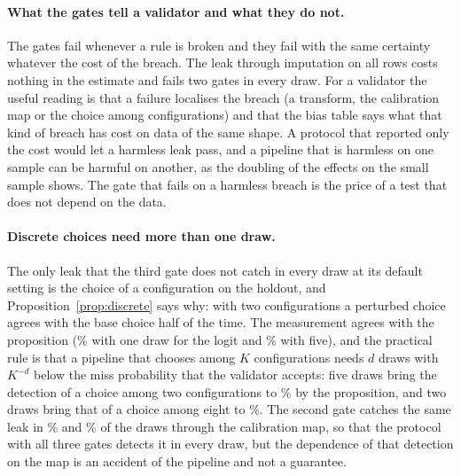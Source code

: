 \paragraph{What the gates tell a validator and what they do not.} The gates fail whenever a rule is broken and they fail with the same certainty whatever the cost of the breach. The leak through imputation on all rows costs nothing in the estimate and fails two gates in every draw. For a validator the useful reading is that a failure localises the breach (a transform, the calibration map or the choice among configurations) and that the bias table says what that kind of breach has cost on data of the same shape. A protocol that reported only the cost would let a harmless leak pass, and a pipeline that is harmless on one sample can be harmful on another, as the doubling of the effects on the small sample shows. The gate that fails on a harmless breach is the price of a test that does not depend on the data.

\paragraph{Discrete choices need more than one draw.} The only leak that the third gate does not catch in every draw at its default setting is the choice of a configuration on the holdout, and Proposition~\ref{prop:discrete} says why: with two configurations a perturbed choice agrees with the base choice half of the time. The measurement agrees with the proposition (\% with one draw for the logit and \% with five), and the practical rule is that a pipeline that chooses among $K$ configurations needs $d$ draws with $K^{-d}$ below the miss probability that the validator accepts: five draws bring the detection of a choice among two configurations to \% by the proposition, and two draws bring that of a choice among eight to \%. The second gate catches the same leak in \% and \% of the draws through the calibration map, so that the protocol with all three gates detects it in every draw, but the dependence of that detection on the map is an accident of the pipeline and not a guarantee.

